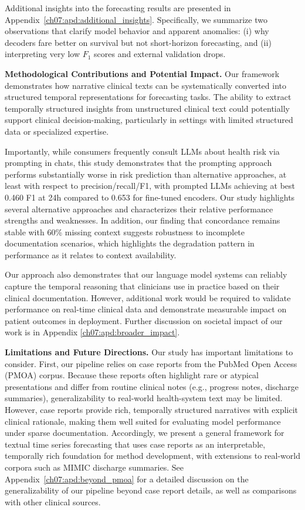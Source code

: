 Additional insights into the forecasting results are presented in Appendix~\ref{ch07:apd:additional_insights}.
Specifically, we summarize two observations that clarify model behavior and apparent anomalies: (i) why decoders fare better on survival but not short-horizon forecasting, and (ii) interpreting very low $F_{1}$ scores and external validation drops.

\textbf{Methodological Contributions and Potential Impact.} Our framework demonstrates how narrative clinical texts can be systematically converted into structured temporal representations for forecasting tasks. The ability to extract temporally structured insights from unstructured clinical text could potentially support clinical decision-making, particularly in settings with limited structured data or specialized expertise. 

Importantly, while consumers frequently consult LLMs about health risk via prompting in chats, this study demonstrates that the prompting approach performs substantially worse in risk prediction than alternative approaches, at least with respect to precision/recall/F1, with prompted LLMs achieving at best 0.460 F1 at 24h compared to 0.653 for fine-tuned encoders.
Our study highlights several alternative approaches and characterizes their relative performance strengths and weaknesses.
In addition, our finding that concordance remains stable with 60\% missing context suggests robustness to incomplete documentation scenarios, which highlights the degradation pattern in performance as it relates to context availability. 

Our approach also demonstrates that our language model systems can reliably capture the temporal reasoning that clinicians use in practice based on their clinical documentation.
However, additional work would be required to validate performance on real-time clinical data and demonstrate measurable impact on patient outcomes in deployment.
Further discussion on societal impact of our work is in Appendix \ref{ch07:apd:broader_impact}.

\textbf{Limitations and Future Directions.} 
Our study has important limitations to consider.
First, our pipeline relies on case reports from the PubMed Open Access (PMOA) corpus.
Because these reports often highlight rare or atypical presentations and differ from routine clinical notes (e.g., progress notes, discharge summaries), generalizability to real-world health-system text may be limited.
However, case reports provide rich, temporally structured narratives with explicit clinical rationale, making them well suited for evaluating model performance under sparse documentation.
Accordingly, we present a general framework for textual time series forecasting that uses case reports as an interpretable, temporally rich foundation for method development, with extensions to real-world corpora such as MIMIC discharge summaries.
See Appendix~\ref{ch07:apd:beyond_pmoa} for a detailed discussion on the generalizability of our pipeline beyond case report details, as well as comparisons with other clinical sources.

